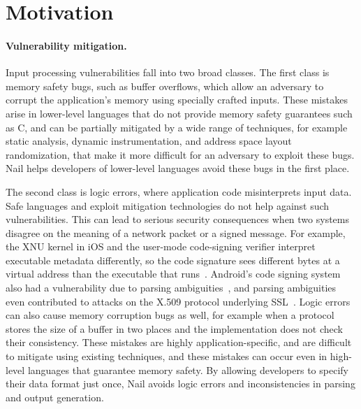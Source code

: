 \section{Motivation}
\label{s:motivation}

\paragraph{Vulnerability mitigation.}

Input processing vulnerabilities fall into two broad classes.  The first
class is memory safety bugs, such as buffer overflows, which allow an
adversary to corrupt the application's memory using specially crafted
inputs.  These mistakes arise in lower-level languages that do not
provide memory safety guarantees such as C, and can be partially
mitigated by a wide range of techniques, for example static analysis,
dynamic instrumentation, and address space layout randomization, that
make it more difficult for an adversary to exploit these bugs.
Nail helps developers of lower-level languages avoid these bugs
in the first place.

The second class is logic errors, where application code misinterprets
input data. Safe languages and exploit mitigation technologies do not
help against such vulnerabilities. This can lead to serious security
consequences when two systems disagree on the meaning of a network
packet or a signed message.  For example, the XNU kernel in iOS and the
user-mode code-signing verifier interpret executable metadata differently,
so the code signature sees different bytes at a virtual address than the
executable that runs~\cite{evaders6}.  Android's code signing system also
had a vulnerability due to parsing ambiguities~\cite{saurik-masterkey},
and parsing ambiguities even contributed to attacks on the X.509 protocol
underlying SSL~\cite{DBLP:conf/fc/KaminskyPS10}.  Logic errors can also
cause memory corruption bugs as well, for example when a protocol stores
the size of a buffer in two places and the implementation does not check
their consistency. These mistakes are highly application-specific, and
are difficult to mitigate using existing techniques, and these mistakes
can occur even in high-level languages that guarantee memory safety. By
allowing developers to specify their data format just once, Nail avoids
logic errors and inconsistencies in parsing and output generation.

